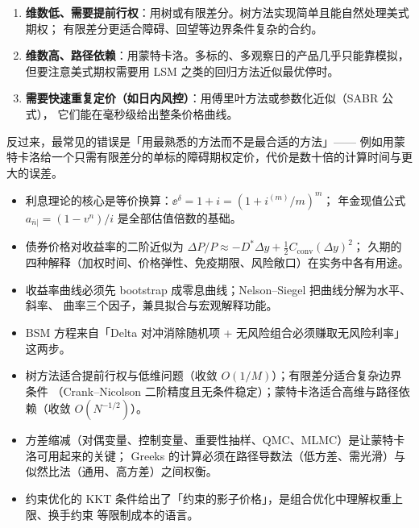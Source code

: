 \begin{warningbox}[数值方法选择的三条经验]
\begin{enumerate}[leftmargin=1.6em]
  \item \textbf{维数低、需要提前行权}：用树或有限差分。树方法实现简单且能自然处理美式期权；
        有限差分更适合障碍、回望等边界条件复杂的合约。
  \item \textbf{维数高、路径依赖}：用蒙特卡洛。多标的、多观察日的产品几乎只能靠模拟，
        但要注意美式期权需要用 LSM 之类的回归方法近似最优停时。
  \item \textbf{需要快速重复定价（如日内风控）}：用傅里叶方法或参数化近似（SABR 公式），
        它们能在毫秒级给出整条价格曲线。
\end{enumerate}
\vspace{0.2em}
反过来，最常见的错误是「用最熟悉的方法而不是最合适的方法」——
例如用蒙特卡洛给一个只需有限差分的单标的障碍期权定价，代价是数十倍的计算时间与更大的误差。
\end{warningbox}

\begin{summarybox}
\begin{itemize}[leftmargin=1.4em]
  \item 利息理论的核心是等价换算：$\ee^{\delta} = 1+i = \left(1+i^{(m)}/m\right)^{m}$；
        年金现值公式 $a_{\overline{n}|}=(1-v^n)/i$ 是全部估值倍数的基础。
  \item 债券价格对收益率的二阶近似为 $\Delta P/P\approx -D^{*}\Delta y+\tfrac12 C_{\text{conv}}(\Delta y)^2$；
        久期的四种解释（加权时间、价格弹性、免疫期限、风险敞口）在实务中各有用途。
  \item 收益率曲线必须先 bootstrap 成零息曲线；Nelson--Siegel 把曲线分解为水平、斜率、
        曲率三个因子，兼具拟合与宏观解释功能。
  \item BSM 方程来自「Delta 对冲消除随机项 + 无风险组合必须赚取无风险利率」这两步。
  \item 树方法适合提前行权与低维问题（收敛 $O(1/M)$）；有限差分适合复杂边界条件
        （Crank--Nicolson 二阶精度且无条件稳定）；蒙特卡洛适合高维与路径依赖（收敛 $O(N^{-1/2})$）。
  \item 方差缩减（对偶变量、控制变量、重要性抽样、QMC、MLMC）是让蒙特卡洛可用起来的关键；
        Greeks 的计算必须在路径导数法（低方差、需光滑）与似然比法（通用、高方差）之间权衡。
  \item 约束优化的 KKT 条件给出了「约束的影子价格」，是组合优化中理解权重上限、换手约束
        等限制成本的语言。
\end{itemize}
\end{summarybox}

